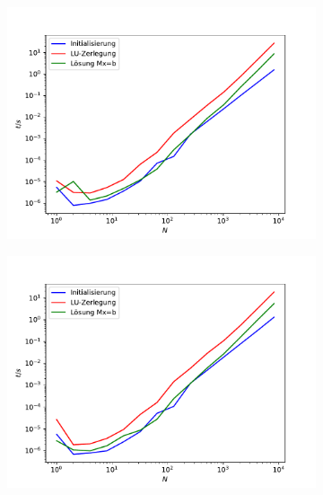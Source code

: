 \documentclass{scrartcl}
\begin{document}
		\begin{figure}[h]
		\centering
		\begin{subfigure}{0.8\textwidth}
		\includegraphics[width=\textwidth]{A2/build/timers.pdf}
		\end{subfigure}
		\begin{subfigure}{0.4\textwidth}
		\includegraphics[width=\textwidth]{A2/Dann_halt_so/timers_PC.pdf}
		\end{subfigure}
		\begin{subfigure}{0.4\textwidth}

\end{subfigure}
\end{figure}
\end{document}
